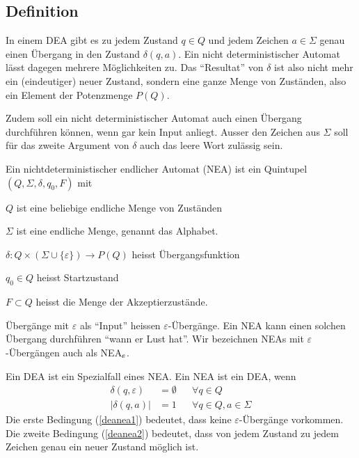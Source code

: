 \subsection{Definition\label{regulaer:definition-nea}}
In einem DEA gibt es zu jedem Zustand $q\in Q$
und jedem Zeichen $a\in\Sigma$ genau
einen Übergang in den Zustand $\delta(q,a)$.
Ein nicht deterministischer Automat lässt dagegen mehrere Möglichkeiten zu.
Das ``Resultat''
von $\delta$ ist also nicht mehr ein (eindeutiger) neuer Zustand, sondern
eine ganze Menge von Zuständen, also ein Element der Potenzmenge $P(Q)$.

Zudem soll ein
nicht deterministischer Automat auch einen Übergang durchführen
können, wenn gar kein Input anliegt.
Ausser den Zeichen aus $\Sigma$ soll für das zweite Argument
von $\delta$ auch das leere Wort zulässig sein.

\begin{definition}\label{definition_nea}
Ein nichtdeterministischer endlicher Automat (NEA) ist ein Quintupel
$(Q,\Sigma,\delta, q_0,F)$ mit
\begin{compactenum}
\item $Q$ ist eine beliebige endliche Menge von Zuständen
\item $\Sigma$ ist eine endliche Menge, genannt das Alphabet.
\item $\delta\colon Q\times(\Sigma\cup\{\varepsilon\})\to P(Q)$ heisst Übergangsfunktion
\item $q_0\in Q$ heisst Startzustand
\item $F\subset Q$ heisst die Menge der Akzeptierzustände.
\end{compactenum}
\end{definition}
%
Übergänge mit $\varepsilon$ als ``Input'' heissen $\varepsilon$-Übergänge.
Ein NEA kann einen solchen Übergang durchführen ``wann er Lust hat''.
Wir bezeichnen NEAs mit $\varepsilon$-Übergängen auch als
NEA$\mathstrut_\varepsilon$.

Ein DEA ist ein Spezialfall eines NEA.
Ein NEA ist ein DEA, wenn
\begin{align}
\delta(q,\varepsilon)&=\emptyset&&\forall q\in Q\label{deanea1}\\
|\delta(q,a)|&=1&&\forall q\in Q, a\in\Sigma\label{deanea2}
\end{align}
Die erste Bedingung (\ref{deanea1}) bedeutet, dass keine
$\varepsilon$-Übergänge vorkommen.
Die zweite Bedingung (\ref{deanea2}) bedeutet, dass von jedem Zustand zu
jedem Zeichen genau ein neuer Zustand möglich ist.

